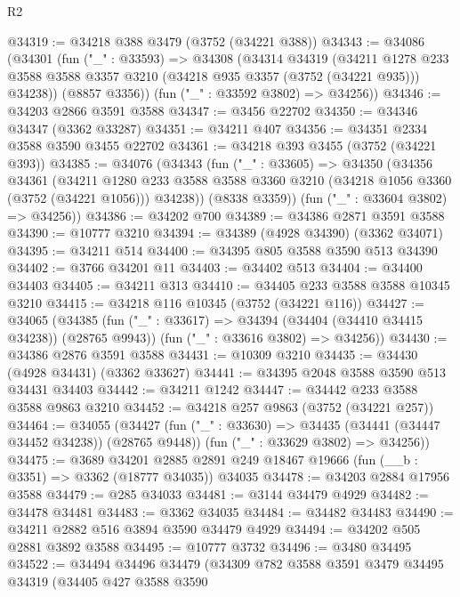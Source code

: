 \begin{lexlean}{R2}
\begin{coremodule}
@34319 := @34218 @388 @3479 (@3752 (@34221 @388))
@34343 := @34086
    (@34301
      (fun ("_" : @33593) =>
      @34308
        (@34314
          @34319
          (@34211
            @1278
            @233
            @3588
            @3588
            @3357
            @3210
            (@34218 @935 @3357 (@3752 (@34221 @935)))
            @34238))
        (@8857 @3356))
      (fun ("_" : @33592 @3802) => @34256))
@34346 := @34203 @2866 @3591 @3588
@34347 := @3456 @22702
@34350 := @34346 @34347 (@3362 @33287)
@34351 := @34211 @407
@34356 := @34351 @2334 @3588 @3590 @3455 @22702
@34361 := @34218 @393 @3455 (@3752 (@34221 @393))
@34385 := @34076
    (@34343
      (fun ("_" : @33605) =>
      @34350
        (@34356
          @34361
          (@34211
            @1280
            @233
            @3588
            @3588
            @3360
            @3210
            (@34218 @1056 @3360 (@3752 (@34221 @1056)))
            @34238))
        (@8338 @3359))
      (fun ("_" : @33604 @3802) => @34256))
@34386 := @34202 @700
@34389 := @34386 @2871 @3591 @3588
@34390 := @10777 @3210
@34394 := @34389 (@4928 @34390) (@3362 @34071)
@34395 := @34211 @514
@34400 := @34395 @805 @3588 @3590 @513 @34390
@34402 := @3766 @34201 @11
@34403 := @34402 @513
@34404 := @34400 @34403
@34405 := @34211 @313
@34410 := @34405 @233 @3588 @3588 @10345 @3210
@34415 := @34218 @116 @10345 (@3752 (@34221 @116))
@34427 := @34065
    (@34385
      (fun ("_" : @33617) => @34394 (@34404 (@34410 @34415 @34238)) (@28765 @9943))
      (fun ("_" : @33616 @3802) => @34256))
@34430 := @34386 @2876 @3591 @3588
@34431 := @10309 @3210
@34435 := @34430 (@4928 @34431) (@3362 @33627)
@34441 := @34395 @2048 @3588 @3590 @513 @34431 @34403
@34442 := @34211 @1242
@34447 := @34442 @233 @3588 @3588 @9863 @3210
@34452 := @34218 @257 @9863 (@3752 (@34221 @257))
@34464 := @34055
    (@34427
      (fun ("_" : @33630) => @34435 (@34441 (@34447 @34452 @34238)) (@28765 @9448))
      (fun ("_" : @33629 @3802) => @34256))
@34475 := @3689
    @34201
    @2885
    @2891
    @249
    @18467
    @19666
    (fun (__b : @3351) => @3362 (@18777 @34035))
    @34035
@34478 := @34203 @2884 @17956 @3588
@34479 := @285 @34033
@34481 := @3144 @34479 @4929
@34482 := @34478 @34481
@34483 := @3362 @34035
@34484 := @34482 @34483
@34490 := @34211 @2882 @516 @3894 @3590 @34479 @4929
@34494 := @34202 @505 @2881 @3892 @3588
@34495 := @10777 @3732
@34496 := @3480 @34495
@34522 := @34494
    @34496
    @34479
    (@34309
      @782
      @3588
      @3591
      @3479
      @34495
      @34319
      (@34405
        @427
        @3588
        @3590

\end{coremodule}
\end{lexlean}
